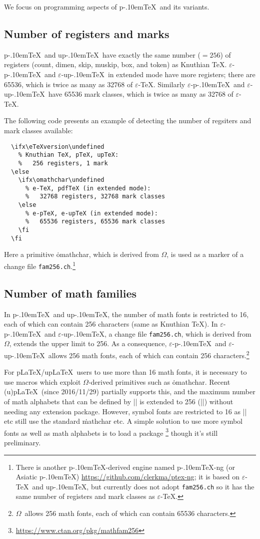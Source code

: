 \documentclass[a4paper,11pt]{article}
\def\code#1{\texttt{#1}}
\def\epTeX{$\varepsilon$-\pTeX}\def\eTeX{$\varepsilon$-\TeX}
\def\eupTeX{$\varepsilon$-\upTeX}\def\upTeX{u\pTeX}
\def\pTeX{p\kern-.10em\TeX}
\def\pLaTeX{p\LaTeX}\def\upLaTeX{u\pLaTeX}
\def\OMEGA{$\Omega$}
\begin{document}
We focus on programming aspects of \pTeX\ and its variants.

\subsection{Number of registers and marks}

\pTeX\ and \upTeX\ have exactly the same number ($=256$) of registers
(count, dimen, skip, muskip, box, and token) as Knuthian \TeX.
\epTeX\ and \eupTeX\ in extended mode have more registers;
there are 65536, which is twice as many as 32768 of \eTeX.
Similarly \epTeX\ and \eupTeX\ have 65536 mark classes,
which is twice as many as 32768 of \eTeX.

The following code presents an example of detecting the number of
regsiters and mark classes available:
\begin{verbatim}
  \ifx\eTeXversion\undefined
    % Knuthian TeX, pTeX, upTeX:
    %   256 registers, 1 mark
  \else
    \ifx\omathchar\undefined
      % e-TeX, pdfTeX (in extended mode):
      %   32768 registers, 32768 mark classes
    \else
      % e-pTeX, e-upTeX (in extended mode):
      %   65536 registers, 65536 mark classes
    \fi
  \fi
\end{verbatim}
Here a primitive \.{omathchar}, which is derived from \OMEGA, is used
as a marker of a change file \code{fam256.ch}.\footnote{%
There is another \pTeX-derived engine named \pTeX-ng (or Asiatic \pTeX)
\url{https://github.com/clerkma/ptex-ng}; it is based on
\eTeX\ and \upTeX, but currently does not adopt \code{fam256.ch}
so it has the same number of registers and mark classes as \eTeX.}

\subsection{Number of math families}

In \pTeX\ and \upTeX,
the number of math fonts is restricted to 16,
each of which can contain 256 characters (same as Knuthian \TeX).
In \epTeX\ and \eupTeX, a change file \code{fam256.ch},
which is derived from \OMEGA, extends the upper limit to 256.
As a consequence, \epTeX\ and \eupTeX\ allows 256 math fonts,
each of which can contain 256 characters.\footnote{\OMEGA\ allows
256 math fonts, each of which can contain 65536 characters.}

For \pLaTeX/\upLaTeX\ users to use more than 16 math fonts,
it is necessary to use macros which exploit \OMEGA-derived primitives
such as \.{omathchar}.
Recent (u)\pLaTeX\ (since 2016/11/29) partially supports this,
and the maximum number of math alphabets that can be defined by
|\DeclareMathAlphabet| is extended to 256 (|\e@mathgroup@top|)
without needing any extension package.
However, symbol fonts are restricted to 16 as
|\DeclareMathSymbol| etc still use the standard \.{mathchar} etc.
A simple solution to use more symbol fonts as well as math alphabets
is to load a package \footnote{%
\url{https://www.ctan.org/pkg/mathfam256}} though it's still preliminary.
\end{document}
